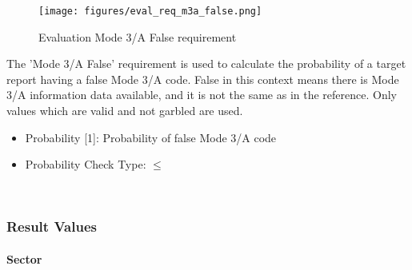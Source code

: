 \begin{figure}[H]
    \texttt{[image: figures/eval\_req\_m3a\_false.png]}
  \caption{Evaluation Mode 3/A False requirement}
\end{figure}

The 'Mode 3/A False' requirement is used to calculate the probability of a target report having a false Mode 3/A code. False in this context means there is Mode 3/A information data available, and it is not the same as in the reference. Only values which are valid and not garbled are used. \\

\begin{itemize}  
\item Probability [1]: Probability of false Mode 3/A code
\item Probability Check Type: $\leq$
\end{itemize}
\ \\

\subsubsection{Result Values}

\paragraph{Sector}

